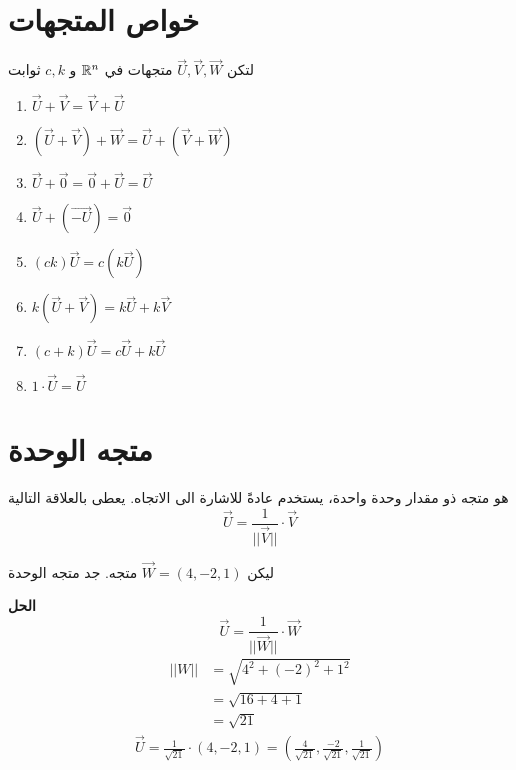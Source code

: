 \section{خواص المتجهات}
لتكن $\vec{U}, \vec{V}, \vec{W}$ متجهات في $\mathbb{R}^n$ و $c,k$ ثوابت
\begin{english}
	\begin{enumerate}
		\item $\vec{U} + \vec{V} = \vec{V} + \vec{U}$
		\item $(\vec{U} + \vec{V} )+ \vec{W} = \vec{U} + (\vec{V} + \vec{W})$
		\item $\vec{U}+\vec{0} = \vec{0} + \vec{U} = \vec{U}$
		\item $\vec{U} + (\vec{-U}) = \vec{0}$
		\item $(ck)\vec{U} = c(k\vec{U})$
		\item $k(\vec{U}+\vec{V}) = k\vec{U} + k\vec{V}$
		\item $(c+k)\vec{U} = c\vec{U} + k\vec{U}$
		\item $1\cdot \vec{U} = \vec{U}$
	\end{enumerate}
\end{english}

\section{متجه الوحدة}
هو متجه ذو مقدار وحدة واحدة، يستخدم عادةً للاشارة الى الاتجاه. يعطى بالعلاقة التالية
\[
\vec{U} = \frac{1}{|| \vec{V}||}\cdot \vec{V}
\]

\begin{example}
	ليكن $\vec{W}=(4,-2,1)$ متجه. جد متجه الوحدة
\end{example}
\noindent
\textbf{الحل}
\[
\vec{U} = \frac{1}{|| \vec{W}||}\cdot \vec{W}
\]
\begin{align*}
	||W|| &= \sqrt{4^2 + (-2)^2 + 1^2}\\
	& = \sqrt{16 + 4 +1}\\
	&= \sqrt{21}
\end{align*}
\begin{align*}
	\vec{U} = \frac{1}{\sqrt{21}}\cdot(4,-2,1) = \left(\frac{4}{\sqrt{21}}, \frac{-2}{\sqrt{21}}, \frac{1}{\sqrt{21}}\right)
\end{align*}


